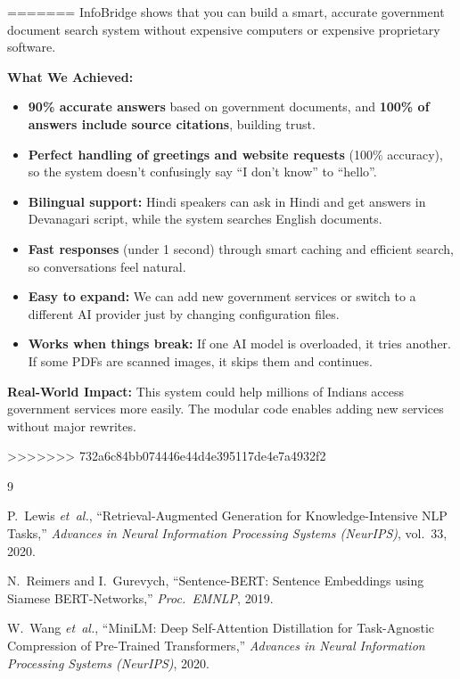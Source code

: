 \documentclass[10pt,twocolumn]{article}
\newcommand{\tightlist}{\setlength{\itemsep}{1pt}\setlength{\topsep}{2pt}\setlength{\parsep}{0pt}}
\begin{document}
\begin{enumerate}
=======
InfoBridge shows that you can build a smart, accurate government document search system without expensive computers or expensive proprietary software.

\smallskip\noindent\textbf{What We Achieved:}
\begin{itemize}
  \tightlist
  \item \textbf{90\% accurate answers} based on government documents, and \textbf{100\% of answers include source citations}, building trust.
  \item \textbf{Perfect handling of greetings and website requests} (100\% accuracy), so the system doesn't confusingly say ``I don't know'' to ``hello''.
  \item \textbf{Bilingual support:} Hindi speakers can ask in Hindi and get answers in Devanagari script, while the system searches English documents.
  \item \textbf{Fast responses} (under 1 second) through smart caching and efficient search, so conversations feel natural.
  \item \textbf{Easy to expand:} We can add new government services or switch to a different AI provider just by changing configuration files.
  \item \textbf{Works when things break:} If one AI model is overloaded, it tries another. If some PDFs are scanned images, it skips them and continues.
\end{itemize}

\smallskip\noindent\textbf{Real-World Impact:}  This system could help millions of Indians access government services more easily. The modular code enables adding new services without major rewrites.

>>>>>>> 732a6c84bb074446e44d4e395117de4e7a4932f2
\begin{thebibliography}{9}

P.~Lewis \textit{et~al.},
``Retrieval-Augmented Generation for Knowledge-Intensive NLP Tasks,''
\textit{Advances in Neural Information Processing Systems (NeurIPS)}, vol.~33, 2020.

N.~Reimers and I.~Gurevych,
``Sentence-BERT: Sentence Embeddings using Siamese BERT-Networks,''
\textit{Proc.\ EMNLP}, 2019.

W.~Wang \textit{et~al.},
``MiniLM: Deep Self-Attention Distillation for Task-Agnostic Compression of
Pre-Trained Transformers,''
\textit{Advances in Neural Information Processing Systems (NeurIPS)}, 2020.


\end{thebibliography}
\end{enumerate}
\end{document}
